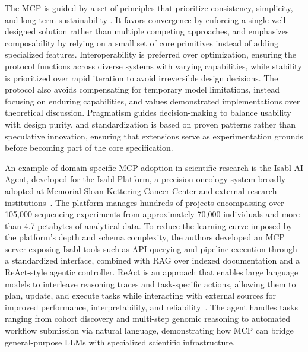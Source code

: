 \documentclass[
english,                 %
bibtex,                  %
includeExtraAbstracts, %
]{kththesis}
\numberwithin{listing}{chapter}
\begin{document}
The \gls{MCP} is guided by a set of principles that prioritize consistency, simplicity, and long-term sustainability \cite{soria_parra_design_2026}. It favors convergence by enforcing a single well-designed solution rather than multiple competing approaches, and emphasizes composability by relying on a small set of core primitives instead of adding specialized features. Interoperability is preferred over optimization, ensuring the protocol functions across diverse systems with varying capabilities, while stability is prioritized over rapid iteration to avoid irreversible design decisions. The protocol also avoids compensating for temporary model limitations, instead focusing on enduring capabilities, and values demonstrated implementations over theoretical discussion. Pragmatism guides decision-making to balance usability with design purity, and standardization is based on proven patterns rather than speculative innovation, ensuring that extensions serve as experimentation grounds before becoming part of the core specification.

An example of domain-specific \gls{MCP} adoption in scientific research is the Isabl \gls{AI} Agent, developed for the Isabl Platform, a precision oncology system broadly adopted at Memorial Sloan Kettering Cancer Center and external research institutions~\cite{arango_ossa_abstract_2026}. The platform manages hundreds of projects encompassing over 105,000 sequencing experiments from approximately 70,000 individuals and more than 4.7 petabytes of analytical data. To reduce the learning curve imposed by the platform's depth and schema complexity, the authors developed an \gls{MCP} server exposing Isabl tools such as \gls{API} querying and pipeline execution through a standardized interface, combined with \gls{RAG} over indexed documentation and a ReAct-style agentic controller. ReAct is an approach that enables large language models to interleave reasoning traces and task-specific actions, allowing them to plan, update, and execute tasks while interacting with external sources for improved performance, interpretability, and reliability~\cite{yao_react_2022}. The agent handles tasks ranging from cohort discovery and multi-step genomic reasoning to automated workflow submission via natural language, demonstrating how \gls{MCP} can bridge general-purpose \glspl{LLM} with specialized scientific infrastructure.
\end{document}
